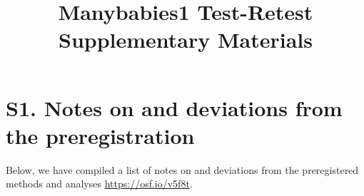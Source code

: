 \documentclass[
  man, donotrepeattitle,floatsintext]{apa6}
\title{Manybabies1 Test-Retest Supplementary Materials}
\author{\phantom{0}}
\date{}
\affiliation{\phantom{0}}
\begin{document}
\maketitle

{
\setcounter{tocdepth}{3}
\tableofcontents
}
\newpage

\hypertarget{s1.-notes-on-and-deviations-from-the-preregistration}{%
\section{S1. Notes on and deviations from the preregistration}\label{s1.-notes-on-and-deviations-from-the-preregistration}}

Below, we have compiled a list of notes on and deviations from the preregistered methods and analyses \url{https://osf.io/v5f8t}.
\end{document}
